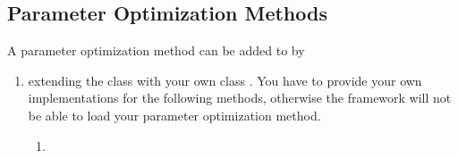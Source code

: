 	
	\subsection{Parameter Optimization Methods}\label{subsec_extend_paramoptmethods}
	A parameter optimization method  can be added to \clusteval by
	\begin{enumerate}
		\item extending the class  with your own class . You have to provide your own implementations for the following methods, otherwise the framework will not be able to load your parameter optimization method.
		\begin{enumerate}
			\item {}
\end{enumerate}
\end{enumerate}
